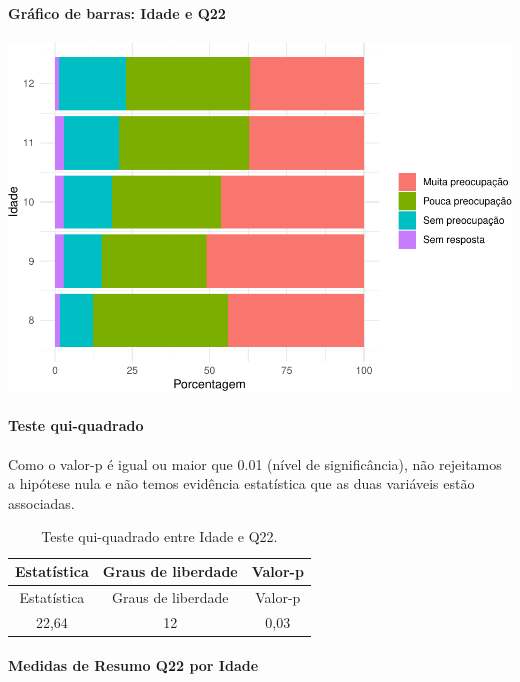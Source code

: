 \documentclass[]{article}
\let\oldparagraph\paragraph
\renewcommand{\paragraph}[1]{\oldparagraph{#1}\mbox{}}
\begin{document}
\hypertarget{gruxe1fico-de-barras-idade-e-q22}{%
\paragraph{Gráfico de barras: Idade e Q22}\label{gruxe1fico-de-barras-idade-e-q22}}

\begin{center}\includegraphics[width=0.75\linewidth]{relatorio_covid19_files/figure-latex/unnamed-chunk-505-1} \end{center}

\hypertarget{teste-qui-quadrado-44}{%
\paragraph{Teste qui-quadrado}\label{teste-qui-quadrado-44}}

Como o valor-p é igual ou maior que 0.01 (nível de significância), não rejeitamos a hipótese nula e não temos evidência estatística que as duas variáveis estão associadas.

\begin{longtable}[]{@{}ccc@{}}
\caption{\label{tab:unnamed-chunk-507}Teste qui-quadrado entre Idade e Q22.}\tabularnewline
\toprule
Estatística & Graus de liberdade & Valor-p\tabularnewline
\midrule
\endfirsthead
\toprule
Estatística & Graus de liberdade & Valor-p\tabularnewline
\midrule
\endhead
22,64 & 12 & 0,03\tabularnewline
\bottomrule
\end{longtable}

\cleardoublepage

\hypertarget{medidas-de-resumo-q22-por-idade}{%
\paragraph{Medidas de Resumo Q22 por Idade}\label{medidas-de-resumo-q22-por-idade}}
\end{document}
